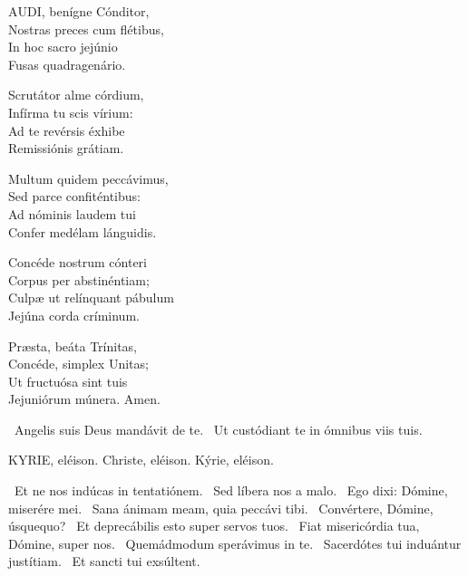 
\lettrine[lines=2]{A}{UDI}, benígne Cónditor,\\
Nostras preces cum flétibus,\\
In hoc sacro jejúnio\\
Fusas quadragenário.

Scrutátor alme córdium,\\
Infírma tu scis vírium:\\
Ad te revérsis éxhibe\\
Remissiónis grátiam.

Multum quidem peccávimus,\\
Sed parce confiténtibus:\\
Ad nóminis laudem tui\\
Confer medélam lánguidis.

Concéde nostrum cónteri\\
Corpus per abstinéntiam;\\
Culpæ ut relínquant pábulum\\
Jejúna corda críminum.

Præsta, beáta Trínitas,\\
Concéde, simplex Unitas;\\
Ut fructuósa sint tuis\\
Jejuniórum múnera. Amen.

\V\ Angelis suis Deus mandávit de te. \R\ Ut custódiant te in ómnibus viis tuis.




KYRIE, eléison. Christe, eléison. Kýrie, eléison.

 \V\ Et ne nos indúcas in tentatiónem. \R\ Sed líbera nos a malo. \V\ Ego dixi: Dómine, miserére mei. \R\ Sana ánimam meam, quia peccávi tibi. \V\ Convértere, Dómine, úsquequo? \R\ Et deprecábilis esto super servos tuos. \V\ Fiat misericórdia tua, Dómine, super nos. \R\ Quemádmodum sperávimus in te. \V\ Sacerdótes tui induántur justítiam. \R\ Et sancti tui exsúltent.

